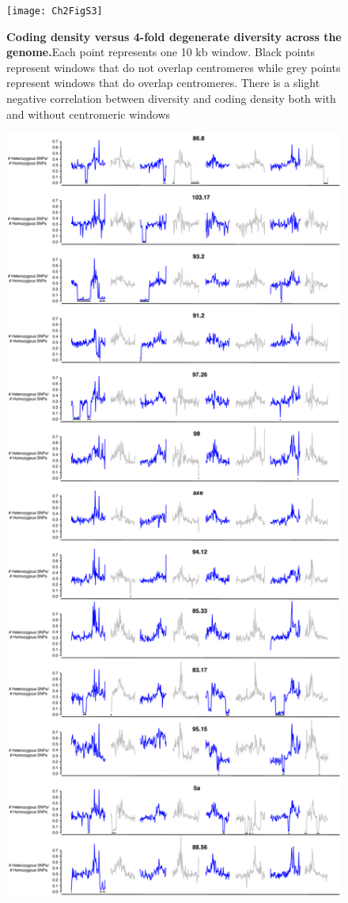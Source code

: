 \begin{figure}[h!]
      \centering
       \texttt{[image: Ch2FigS3]}
    \caption{\textbf{Coding density versus 4-fold degenerate diversity across the genome.}Each point represents one 10 kb window. Black points represent windows that do not overlap centromeres while grey points represent windows that do overlap centromeres. There is a slight negative correlation between diversity and coding density both with and without centromeric windows}
    \label{fig:figS3}
\end{figure}

\begin{figure}[h!]
      \centering
       \includegraphics[scale=0.1]{Ch2FigS4}

\end{figure}

